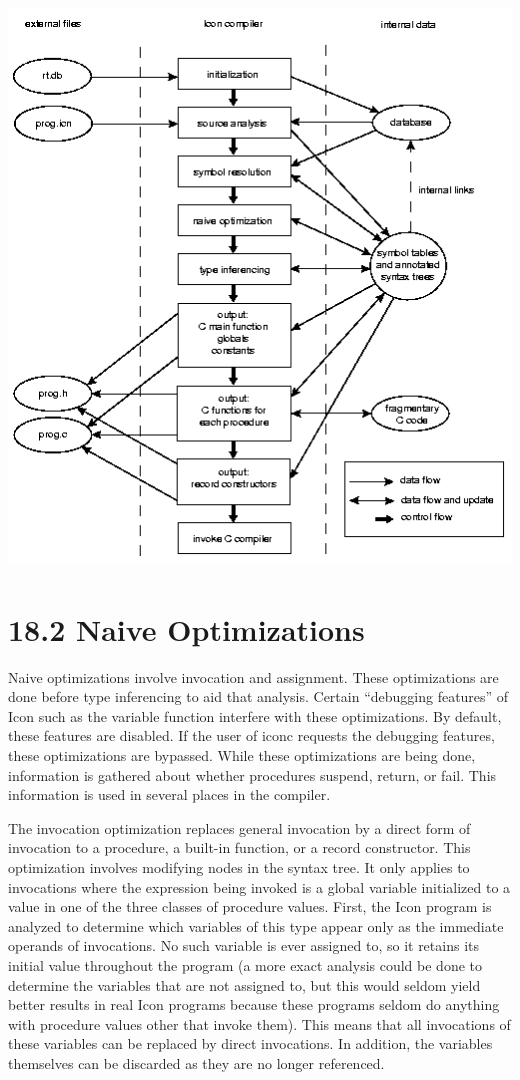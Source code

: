 \includegraphics[width=5.5484in,height=5.822in]{kw/figure6-1.png}  


\section[18.2 Naive Optimizations]{18.2 Naive Optimizations}

Naive optimizations involve invocation and assignment. These
optimizations are done before type inferencing to aid that
analysis. Certain ``debugging features'' of Icon such as the
variable function interfere with these optimizations. By default,
these features are disabled. If the user of iconc requests the
debugging features, these optimizations are bypassed. While these
optimizations are being done, information is gathered about whether
procedures suspend, return, or fail. This information is used in
several places in the compiler.

The invocation optimization replaces general invocation by a direct
form of invocation to a procedure, a built-in function, or a record
constructor. This optimization involves modifying nodes in the syntax
tree. It only applies to invocations where the expression being
invoked is a global variable initialized to a value in one of the
three classes of procedure values. First, the Icon program is analyzed
to determine which variables of this type appear only as the immediate
operands of invocations. No such variable is ever assigned to, so it
retains its initial value throughout the program (a more exact
analysis could be done to determine the variables that are not
assigned to, but this would seldom yield better results in real Icon
programs because these programs seldom do anything with procedure
values other that invoke them). This means that all invocations of
these variables can be replaced by direct invocations. In addition,
the variables themselves can be discarded as they are no longer
referenced.

